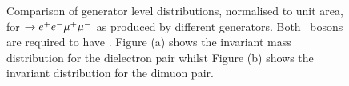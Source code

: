 \begin{figure}
\centering
        \vspace{-5mm}
        \vspace{-2mm}
    \caption{\small Comparison of generator level distributions, normalised to
    unit area, for \qqZZ $\rightarrow e^{+}e^{-}\mu^{+}\mu^{-}$ as produced by different generators. Both 
    \Z\ bosons
    are required to have \sstooos. Figure (a)
    shows the invariant mass distribution for the dielectron pair whilst Figure 
    (b) shows the invariant distribution for the dimuon pair.
    } 
    
    \label{fig:gen-comp-mZ} 
    \end{figure}


